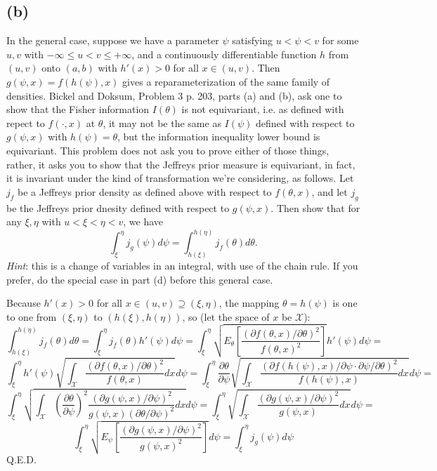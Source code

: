 \documentclass[11pt]{article}
\newcommand{\ProbS}{\iftrue}
\newcommand{\ProbE}{\fi}
\begin{document}
\subsection*{(b)}
\ProbS
In the general case, suppose we have a parameter $\psi$ satisfying
$u < \psi < v$ for some $u,v$ with $-\infty \leq u < v \leq +\infty$,
and a continuously differentiable function $h$ from $(u,v)$ onto $(a,b)$ with $h'(x)>0$ for all $x \in (u,v)$.
Then $g(\psi, x) = f(h(\psi), x)$ gives a reparameterization of the same family of densities.
Bickel and Doksum, Problem 3 p. 203, parts (a) and (b), ask one to show that the Fisher information $I(\theta)$ is not equivariant, i.e. as defined with repect to $f(\cdot, x)$ at $\theta$, it may not be the same as $I(\psi)$ defined with respect to $g(\psi, x)$ with $h(\psi)=\theta$, but the information inequality lower bound is equivariant.
This problem does not ask you to prove either of those things, rather, it asks you to show that the Jeffreys prior measure is equivariant, in fact, it is invariant under the kind of transformation we're considering, as follows.
Let $j_f$ be a Jeffreys prior density as defined above with respect to $f(\theta, x)$, and let $j_g$ be the Jeffreys prior dnesity defined with respect to $g(\psi, x)$. Then show that for any $\xi, \eta$ with $u < \xi < \eta < v$, we have
$$
\int_{\xi}^{\eta} j_g(\psi)d\psi = \int_{h(\xi)}^{h(\eta)} j_f(\theta) d\theta.
$$
\emph{Hint}: this is a change of variables in an integral, with use of the chain rule. If you prefer, do the special case in part (d) before this general case.
\ProbE

\newcommand{\spaceX}{\mathcal{X}}

Because $h'(x)>0$ for all $x \in (u,v) \supseteq (\xi, \eta)$, the mapping $\theta = h(\psi)$ is one to one from $(\xi, \eta)$ to $(h(\xi), h(\eta))$, so (let the space of $x$ be $\spaceX$):
$$
\int_{h(\xi)}^{h(\eta)} j_f(\theta) d\theta =
\int_{\xi}^{\eta} j_f(\theta) h'(\psi) d\psi =
\int_{\xi}^{\eta} \sqrt{E_{\theta} \left[\frac{(\partial f(\theta, x) / \partial \theta)^2}{f(\theta, x)^2}\right] }h'(\psi) d\psi =
$$
$$
\int_{\xi}^{\eta} h'(\psi) \sqrt{ \int_{\spaceX} \frac{(\partial f(\theta, x) / \partial \theta)^2}{f(\theta, x)} dx }d\psi =
\int_{\xi}^{\eta} \frac{\partial \theta}{\partial \psi} \sqrt{ \int_{\spaceX} \frac{(\partial f(h(\psi), x) / \partial \psi \cdot \partial \psi / \partial \theta)^2}{f(h(\psi), x)} dx }d\psi =
$$
$$
\int_{\xi}^{\eta} \sqrt{ \int_{\spaceX} \left(\frac{\partial \theta}{\partial \psi}\right)^2 \frac{(\partial g(\psi, x) / \partial \psi)^2}{ g(\psi, x) ( \partial \theta / \partial \psi)^2} dx }d\psi =
\int_{\xi}^{\eta} \sqrt{ \int_{\spaceX} \frac{(\partial g(\psi, x) / \partial \psi)^2}{ g(\psi, x)} dx }d\psi =
$$
$$
\int_{\xi}^{\eta} \sqrt{E_{\psi} \left[\frac{(\partial g(\psi, x) / \partial \psi)^2}{g(\psi, x)^2}\right] } d\psi =
\int_{\xi}^{\eta} j_g(\psi) d\psi
$$
Q.E.D.
\end{document}

